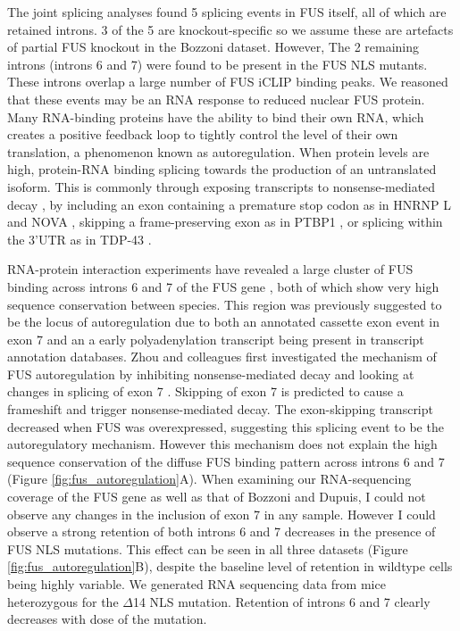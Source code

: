The joint splicing analyses found 5 splicing events in FUS itself, all of which are retained introns. 3 of the 5 are knockout-specific so we assume these are artefacts of partial FUS knockout in the Bozzoni dataset. 
However, The 2 remaining introns (introns 6 and 7) were found to be present in the FUS NLS mutants.
These introns overlap a large number of FUS iCLIP binding peaks.
We reasoned that these events may be an RNA response to reduced nuclear FUS protein.
Many RNA-binding proteins have the ability to bind their own RNA, which creates  a positive feedback loop to tightly control the level of their own translation, a phenomenon known as autoregulation.
When protein levels are high, protein-RNA binding splicing towards the production of an untranslated isoform.
This is commonly through exposing transcripts to nonsense-mediated decay \citep{McGlincy2008-wh}, by including an exon containing a premature stop codon as in HNRNP L and NOVA \citep{Rossbach2009,Dredge2005}, skipping a frame-preserving exon as in PTBP1 \citep{Wollerton2004}, or splicing within the 3'UTR as in TDP-43 \citep{Ayala2011}. 

RNA-protein interaction experiments have revealed a large cluster of FUS binding across introns 6 and 7 of the FUS gene \citep{Lagier-Tourenne2012}, both of which show very high sequence conservation between species.
This region was previously suggested to be the locus of autoregulation due to both an annotated cassette exon event in exon 7 and an a early polyadenylation transcript being present in transcript annotation databases.
Zhou and colleagues first investigated the mechanism of FUS autoregulation by inhibiting nonsense-mediated decay and looking at changes in splicing of exon 7 \cite{Zhou2013}.
Skipping of exon 7 is predicted to cause a frameshift and trigger nonsense-mediated decay. 
The exon-skipping transcript decreased when FUS was overexpressed, suggesting this splicing event to be the autoregulatory mechanism.
However this mechanism does not explain the high sequence conservation of the diffuse FUS binding pattern across introns 6 and 7 (Figure \ref{fig:fus_autoregulation}A).
When examining our RNA-sequencing coverage of the FUS gene as well as that of Bozzoni and Dupuis, I could not observe any changes in the inclusion of exon 7 in any sample.
However I could observe a strong retention of both introns 6 and 7 decreases in the presence of FUS NLS mutations. 
This effect can be seen in all three datasets (Figure \ref{fig:fus_autoregulation}B), despite the baseline level of retention in wildtype cells being highly variable. 
We generated RNA sequencing data from mice heterozygous for the $\Delta$14 NLS mutation. Retention of introns 6 and 7 clearly decreases with dose of the mutation.


